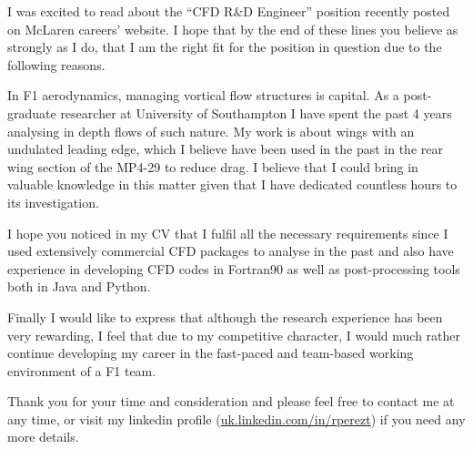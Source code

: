 \documentclass[10pt,stdletter,dateno,sigleft]{newlfm} %
\newcommand{\job}{CFD R\&D Engineer}
\newcommand{\jobweb}{McLaren careers' website}
\begin{document}
\begin{newlfm}



I was excited to read about the ``\job'' position recently posted on \jobweb.
I hope that by the end of these lines you believe as strongly as I do, that I am the
right fit for the position in question due to the following reasons.

In F1 aerodynamics, managing vortical flow structures is capital. As a post-graduate
researcher at University of Southampton I have spent the past 4 years analysing in depth
flows of such nature. My work is about wings with an undulated leading edge, which I
believe have been used in the past in the rear wing section of the MP4-29 to reduce drag.
I believe that I could bring in valuable knowledge in this matter given that I have
dedicated countless hours to its investigation.

I hope you noticed in my CV that I fulfil all the necessary requirements since I used
extensively commercial CFD packages to analyse in the past and also have experience in developing CFD
codes in Fortran90 as well as post-processing tools both in Java and Python.

Finally I would like to express that although the research experience has been very
rewarding, I feel that due to my competitive character, I would much rather continue
developing my career in the fast-paced and team-based working environment of a F1 team.

Thank you for your time and consideration and please feel free to contact me at any time,
or visit my linkedin profile
(\href{https://uk.linkedin.com/in/rperezt}{uk.linkedin.com/in/rperezt}) if you need any
more details.


\end{newlfm}
\end{document}
